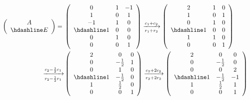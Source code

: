 \begin{solution}
    \begin{align*}
        \left(\begin{array}{c}
            A \\ \hdashline E
        \end{array}\right) ={} & \left(\begin{array}{ccc}
            0 & 1 & -1 \\
            1 & 0 & 1  \\
            -1 & 1 & 0 \\
            \hdashline
            1 & 0 & 0 \\
            0 & 1 & 0 \\
            0 & 0 & 1
        \end{array}\right)
        \xrightarrow[r_1+r_2]{c_1+c_2} \left(\begin{array}{ccc}
            2 & 1 & 0 \\
            1 & 0 & 1  \\
            0 & 1 & 0 \\
            \hdashline
            1 & 0 & 0 \\
            1 & 1 & 0 \\
            0 & 0 & 1
        \end{array}\right) & \\
        \xrightarrow[r_2-\frac{1}{2}r_1]{c_2-\frac{1}{2}c_1} & \left(\begin{array}{ccc}
            2 & 0 & 0 \\
            0 & -\frac{1}{2} & 1  \\
            0 & 1 & 0 \\
            \hdashline
            1 & -\frac{1}{2} & 0 \\
            1 & \frac{1}{2} & 0 \\
            0 & 0 & 1
        \end{array}\right)
        \xrightarrow[r_3+2r_2]{c_3+2c_2} \left(\begin{array}{ccc}
            2 & 0 & 0 \\
            0 & -\frac{1}{2} & 0  \\
            0 & 0 & 2 \\
            \hdashline
            1 & -\frac{1}{2} & -1 \\
            1 & \frac{1}{2} & 1 \\
            0 & 0 & 1
        \end{array}\right) & \\
    \end{align*}
\end{solution}

